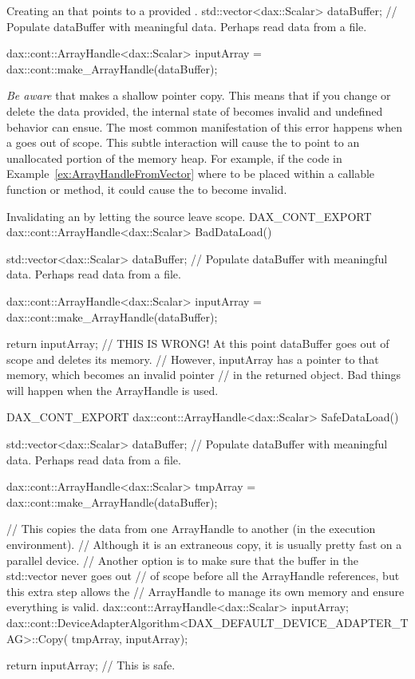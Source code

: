 \begin{daxexample}[ex:ArrayHandleFromVector]{Creating an  that points to a provided .}
std::vector<dax::Scalar> dataBuffer;
// Populate dataBuffer with meaningful data. Perhaps read data from a file.

dax::cont::ArrayHandle<dax::Scalar> inputArray = dax::cont::make_ArrayHandle(dataBuffer);
\end{daxexample}

\emph{Be aware} that  makes a shallow pointer
copy. This means that if you change or delete the data provided, the
internal state of  becomes invalid and undefined
behavior can ensue. The most common manifestation of this error happens
when a  goes out of scope. This subtle interaction
will cause the  to point to an unallocated portion of
the memory heap. For example, if the code in
Example~\ref{ex:ArrayHandleFromVector} where to be placed within a callable
function or method, it could cause the  to become
invalid.

\begin{daxexample}{Invalidating an  by letting the source  leave scope.}
DAX_CONT_EXPORT
dax::cont::ArrayHandle<dax::Scalar> BadDataLoad()
{
  std::vector<dax::Scalar> dataBuffer;
  // Populate dataBuffer with meaningful data. Perhaps read data from a file.

  dax::cont::ArrayHandle<dax::Scalar> inputArray = dax::cont::make_ArrayHandle(dataBuffer);

  return inputArray;
  // THIS IS WRONG! At this point dataBuffer goes out of scope and deletes its memory.
  // However, inputArray has a pointer to that memory, which becomes an invalid pointer
  // in the returned object. Bad things will happen when the ArrayHandle is used.
}

DAX_CONT_EXPORT
dax::cont::ArrayHandle<dax::Scalar> SafeDataLoad()
{
  std::vector<dax::Scalar> dataBuffer;
  // Populate dataBuffer with meaningful data. Perhaps read data from a file.

  dax::cont::ArrayHandle<dax::Scalar> tmpArray = dax::cont::make_ArrayHandle(dataBuffer);

  // This copies the data from one ArrayHandle to another (in the execution environment).
  // Although it is an extraneous copy, it is usually pretty fast on a parallel device.
  // Another option is to make sure that the buffer in the std::vector never goes out
  // of scope before all the ArrayHandle references, but this extra step allows the
  // ArrayHandle to manage its own memory and ensure everything is valid.
  dax::cont::ArrayHandle<dax::Scalar> inputArray;
  dax::cont::DeviceAdapterAlgorithm<DAX_DEFAULT_DEVICE_ADAPTER_TAG>::Copy(
      tmpArray, inputArray);

  return inputArray;
  // This is safe.
}
\end{daxexample}

